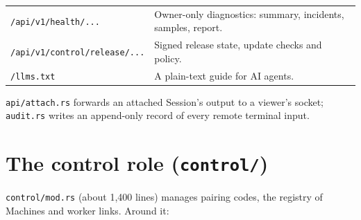 \begin{small}
\begin{longtable}{>{\raggedright\arraybackslash}p{0.410\dimexpr \linewidth-4\tabcolsep\relax}>{\raggedright\arraybackslash}p{0.590\dimexpr \linewidth-4\tabcolsep\relax}}
\texttt{/\allowbreak{}api/\allowbreak{}v1/\allowbreak{}health/\allowbreak{}.\allowbreak{}.\allowbreak{}.\allowbreak{}} & Owner-only diagnostics: summary, incidents, samples, report. \\
\texttt{/\allowbreak{}api/\allowbreak{}v1/\allowbreak{}control/\allowbreak{}release/\allowbreak{}.\allowbreak{}.\allowbreak{}.\allowbreak{}} & Signed release state, update checks and policy. \\
\texttt{/\allowbreak{}llms.\allowbreak{}txt} & A plain-text guide for AI agents. \\
\bottomrule
\end{longtable}
\end{small}

\texttt{api/\allowbreak{}attach.\allowbreak{}rs} forwards an attached Session's output to a viewer's socket; \texttt{audit.\allowbreak{}rs} writes an append-only record of every remote terminal input.

\section{\texorpdfstring{The control role (\texttt{control/\allowbreak{}})}{The control role (control/)}}

\texttt{control/\allowbreak{}mod.\allowbreak{}rs} (about 1,400 lines) manages pairing codes, the registry of Machines and worker links. Around it:

